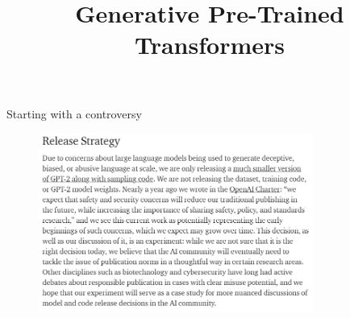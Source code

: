 



\newcommand{\titlefigure}{figure/gpt2-title.png}
\newcommand{\learninggoals}{
\item 
Understand language models as universal task solvers
\item Understand the implications of such models}

\title{Generative Pre-Trained Transformers}
\date{}




\begin{frame}{Starting with a controversy}

\vfill

\begin{figure}
\centering
\includegraphics[width = 9cm]{figure/72-gpt2-release.png}\\ 
\end{figure}

\vfill

\end{frame}


